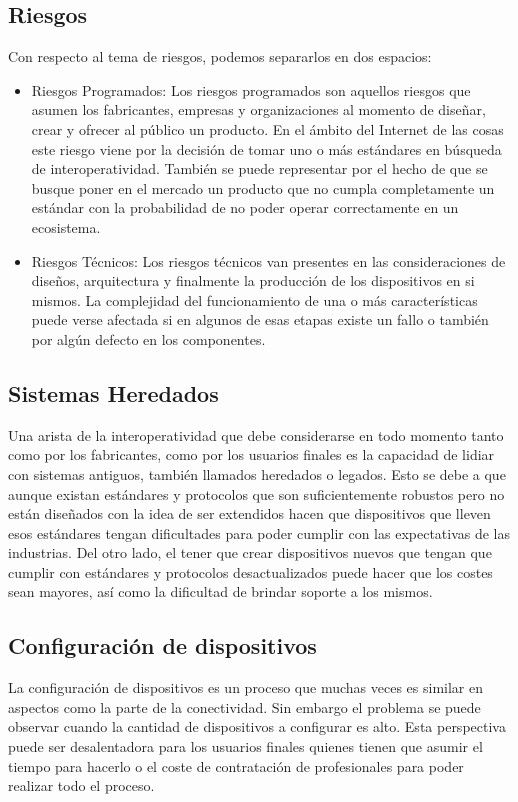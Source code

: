 \subsection{Riesgos}
Con respecto al tema de riesgos, podemos separarlos en dos espacios:
\begin{itemize}
\item Riesgos Programados: Los riesgos programados son aquellos riesgos que asumen los fabricantes, empresas y organizaciones al momento de diseñar, crear y ofrecer al público un producto. En el ámbito del Internet de las cosas este riesgo viene por la decisión de tomar uno o más estándares en búsqueda de interoperatividad. También se puede representar por el hecho de que se busque poner en el mercado un producto que no cumpla completamente un estándar con la probabilidad de no poder operar correctamente en un ecosistema.
\item Riesgos Técnicos: Los riesgos técnicos van presentes en las consideraciones de diseños, arquitectura y finalmente la producción de los dispositivos en si mismos. La complejidad del funcionamiento de una o más características puede verse afectada si en algunos de esas etapas existe un fallo o también por algún defecto en los componentes. 
\end{itemize}

\subsection{Sistemas Heredados}
Una arista de la interoperatividad que debe considerarse en todo momento tanto como por los fabricantes, como por los usuarios finales es la capacidad de lidiar con sistemas antiguos, también llamados heredados o legados. Esto se debe a que aunque existan estándares y protocolos que son suficientemente robustos pero no están diseñados con la idea de ser extendidos hacen que dispositivos que lleven esos estándares tengan dificultades para poder cumplir con las expectativas de las industrias. Del otro lado, el tener que crear dispositivos nuevos que tengan que cumplir con estándares y protocolos desactualizados puede hacer que los costes sean mayores, así como la dificultad de brindar soporte a los mismos. 

\subsection{Configuración de dispositivos}
La configuración de dispositivos es un proceso que muchas veces es similar en aspectos como la parte de la conectividad. Sin embargo el problema se puede observar cuando la cantidad de dispositivos a configurar es alto. Esta perspectiva puede ser desalentadora para los usuarios finales quienes tienen que asumir el tiempo para hacerlo o el coste de contratación de profesionales para poder realizar todo el proceso. 

